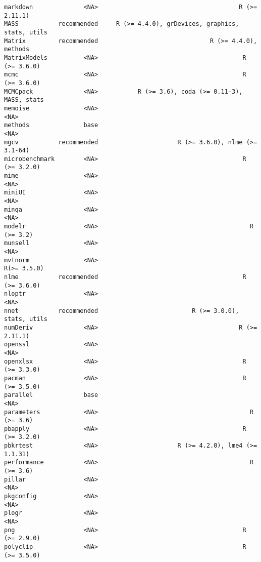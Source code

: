 \documentclass[
  letterpaper,
  DIV=11,
  numbers=noendperiod]{scrreprt}
\begin{document}
\begin{verbatim}
markdown              <NA>                                       R (>= 2.11.1)
MASS           recommended     R (>= 4.4.0), grDevices, graphics, stats, utils
Matrix         recommended                               R (>= 4.4.0), methods
MatrixModels          <NA>                                        R (>= 3.6.0)
mcmc                  <NA>                                        R (>= 3.6.0)
MCMCpack              <NA>           R (>= 3.6), coda (>= 0.11-3), MASS, stats
memoise               <NA>                                                <NA>
methods               base                                                <NA>
mgcv           recommended                      R (>= 3.6.0), nlme (>= 3.1-64)
microbenchmark        <NA>                                        R (>= 3.2.0)
mime                  <NA>                                                <NA>
miniUI                <NA>                                                <NA>
minqa                 <NA>                                                <NA>
modelr                <NA>                                          R (>= 3.2)
munsell               <NA>                                                <NA>
mvtnorm               <NA>                                         R(>= 3.5.0)
nlme           recommended                                        R (>= 3.6.0)
nloptr                <NA>                                                <NA>
nnet           recommended                          R (>= 3.0.0), stats, utils
numDeriv              <NA>                                       R (>= 2.11.1)
openssl               <NA>                                                <NA>
openxlsx              <NA>                                        R (>= 3.3.0)
pacman                <NA>                                        R (>= 3.5.0)
parallel              base                                                <NA>
parameters            <NA>                                          R (>= 3.6)
pbapply               <NA>                                        R (>= 3.2.0)
pbkrtest              <NA>                      R (>= 4.2.0), lme4 (>= 1.1.31)
performance           <NA>                                          R (>= 3.6)
pillar                <NA>                                                <NA>
pkgconfig             <NA>                                                <NA>
plogr                 <NA>                                                <NA>
png                   <NA>                                        R (>= 2.9.0)
polyclip              <NA>                                        R (>= 3.5.0)

\end{verbatim}
\end{document}
